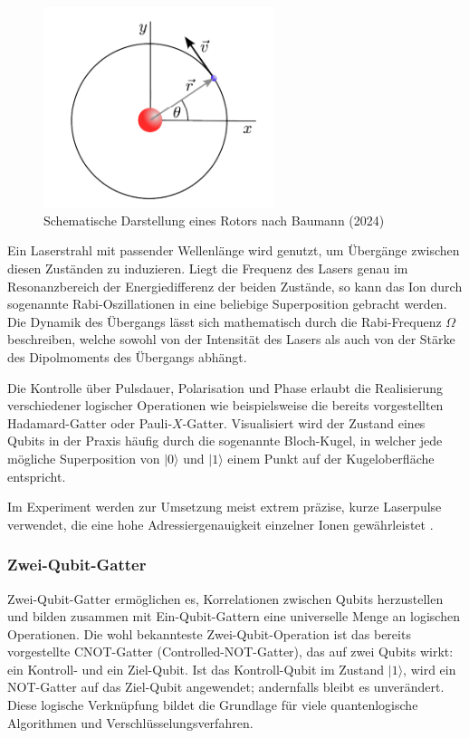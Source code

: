 \begin{figure}[ht]
    \centering
    \includegraphics[width=0.6\textwidth]{images/quanten-hardware/Rotor.png}
    \caption{Schematische Darstellung eines Rotors nach Baumann (2024)}
    \label{fig:meinbild}
\end{figure}

Ein Laserstrahl mit passender Wellenlänge wird genutzt, um Übergänge zwischen diesen Zuständen zu induzieren. Liegt die Frequenz des Lasers genau im Resonanzbereich der Energiedifferenz der beiden Zustände, so kann das Ion durch sogenannte Rabi-Oszillationen in eine beliebige Superposition gebracht werden. Die Dynamik des Übergangs lässt sich mathematisch durch die Rabi-Frequenz \( \Omega \) beschreiben, welche sowohl von der Intensität des Lasers als auch von der Stärke des Dipolmoments des Übergangs abhängt.

Die Kontrolle über Pulsdauer, Polarisation und Phase erlaubt die Realisierung verschiedener logischer Operationen wie beispielsweise die bereits vorgestellten Hadamard-Gatter oder Pauli-\( X \)-Gatter. Visualisiert wird der Zustand eines Qubits in der Praxis häufig durch die sogenannte Bloch-Kugel, in welcher jede mögliche Superposition von \( \lvert 0 \rangle \) und \( \lvert 1 \rangle \) einem Punkt auf der Kugeloberfläche entspricht.

Im Experiment werden zur Umsetzung meist extrem präzise, kurze Laserpulse verwendet, die eine hohe Adressiergenauigkeit einzelner Ionen gewährleistet \cite{baumann_ionenfallen-quantencomputer_2024}.

\subsubsection{Zwei-Qubit-Gatter}

Zwei-Qubit-Gatter ermöglichen es, Korrelationen zwischen Qubits herzustellen und bilden zusammen mit Ein-Qubit-Gattern eine universelle Menge an logischen Operationen. Die wohl bekannteste Zwei-Qubit-Operation ist das bereits vorgestellte CNOT-Gatter (Controlled-NOT-Gatter), das auf zwei Qubits wirkt: ein Kontroll- und ein Ziel-Qubit. Ist das Kontroll-Qubit im Zustand \( \lvert 1 \rangle \), wird ein NOT-Gatter auf das Ziel-Qubit angewendet; andernfalls bleibt es unverändert. Diese logische Verknüpfung bildet die Grundlage für viele quantenlogische Algorithmen und Verschlüsselungsverfahren.

